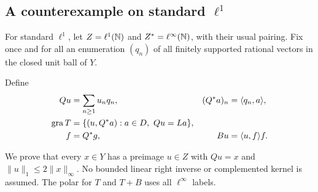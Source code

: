 \subsection{A counterexample on standard $\ell^1$}

For standard $\ell^1$, let $Z=\ell^1(\mathbb N)$ and $Z^*=\ell^\infty(\mathbb N)$,
with their usual pairing. Fix once and for all an enumeration $(q_n)$ of
all finitely supported rational vectors in the closed unit ball of $Y$.
\begin{definition}
Define
\begin{equation}
\begin{aligned}
Qu&=\sum_{n\ge1}u_nq_n,& (Q^*a)_n&=\langle q_n,a\rangle,\\
\operatorname{gra} T&=\{(u,Q^*a):a\in D,\ Qu=La\},\\
f&=Q^*g,& Bu&=\langle u,f\rangle f.
\end{aligned}
\label{eq:D10}
\end{equation}
\end{definition}
We prove that every $x\in Y$ has a preimage $u\in Z$ with
$Qu=x$ and $\|u\|_1\le2\|x\|_\infty$. No bounded linear
right inverse or complemented kernel is assumed. The polar for $T$ and
$T+B$ uses all $\ell^\infty$ labels.

